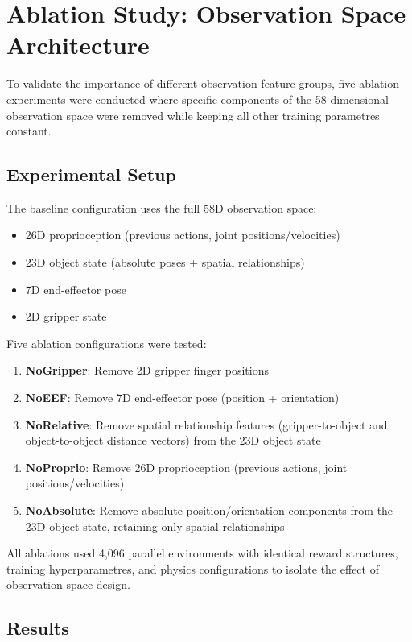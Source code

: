 \documentclass[12pt,a4paper,oneside]{report}
\begin{document}
\section{Ablation Study: Observation Space Architecture}

To validate the importance of different observation feature groups, five ablation experiments were conducted where specific components of the 58-dimensional observation space were removed while keeping all other training parametres constant.

\subsection{Experimental Setup}

The baseline configuration uses the full 58D observation space:
\begin{itemize}
    \item 26D proprioception (previous actions, joint positions/velocities)
    \item 23D object state (absolute poses + spatial relationships)
    \item 7D end-effector pose
    \item 2D gripper state
\end{itemize}

Five ablation configurations were tested:
\begin{enumerate}
    \item \textbf{NoGripper}: Remove 2D gripper finger positions
    \item \textbf{NoEEF}: Remove 7D end-effector pose (position + orientation)
    \item \textbf{NoRelative}: Remove spatial relationship features (gripper-to-object and object-to-object distance vectors) from the 23D object state
    \item \textbf{NoProprio}: Remove 26D proprioception (previous actions, joint positions/velocities)
    \item \textbf{NoAbsolute}: Remove absolute position/orientation components from the 23D object state, retaining only spatial relationships
\end{enumerate}

All ablations used 4,096 parallel environments with identical reward structures, training hyperparametres, and physics configurations to isolate the effect of observation space design.

\subsection{Results}
\end{document}
